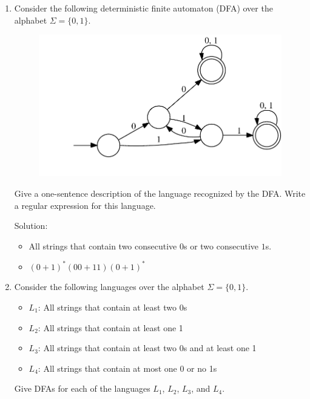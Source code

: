 \documentclass[11pt]{article}
\begin{document}

\begin{enumerate}

\item
Consider the following deterministic finite automaton (DFA) over the
alphabet $\Sigma = \{0, 1\}$.
\begin{figure}[htb]
\begin{center}
\includegraphics[scale=0.7]{consec-two.pdf}
\end{center}
\end{figure}

Give a one-sentence description of the language recognized by the DFA.
Write a regular expression for this language.

Solution:

\begin{itemize}

\item All strings that contain two consecutive $0$s or two consecutive
$1$s.

\item $(0 + 1)^{*}(00 + 11)(0 + 1)^{*}$

\end{itemize}

\item
\label{closure-q}
Consider the following languages over the alphabet
$\Sigma = \{0, 1\}$.
\begin{itemize}
\item $L_1$: All strings that contain at least two 0s
\item $L_2$: All strings that contain at least one 1
\item $L_3$:
All strings that contain at least two 0s and at least one 1
\item $L_4$: All strings that contain at most one 0 or no 1s
\end{itemize}
Give DFAs for each of the languages $L_1$, $L_2$, $L_3$, and $L_4$.


\end{enumerate}
\end{document}
